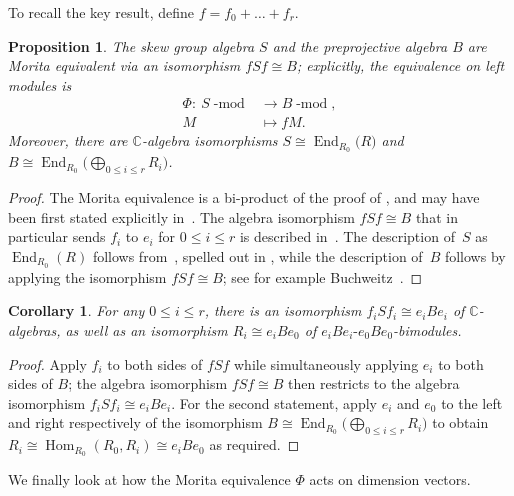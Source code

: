 \documentclass[pdftex]{sigma}%
\newtheorem{Corollary}[Theorem]{Corollary}
\newtheorem{Proposition}[Theorem]{Proposition}
 { \theoremstyle{definition}
\newtheorem{Definition}[Theorem]{Definition}
\newtheorem{Example}[Theorem]{Example}
\newtheorem{Remark}[Theorem]{Remark}
\newtheorem{remarks}[theorem]{Remarks}
}
\newcommand{\SC}{\mathbb{C}} %
\newcommand{\End}{\operatorname{End}}
\newcommand{\Hom}{\operatorname{Hom}}
\DeclareMathOperator{\module}{\mathrm{-mod}}
\numberwithin{equation}{section}
\begin{document}
To recall the key result, define $f=f_0+\dots+f_r$.

\begin{Proposition}\label{prop_morita}
The skew group algebra $S$ and the preprojective algebra $B$ are Morita equivalent via an isomorphism $f S f\cong B$; explicitly, the equivalence on left modules is
\begin{align*}\Phi\colon \ S\module & \longrightarrow B\module, \\
M & \mapsto fM.
\end{align*}
Moreover, there are $\mathbb{C}$-algebra isomorphisms
$S\cong \End_{R_0}\big(R)$ and $B\cong \End_{R_0}\big({\bigoplus}_{0\leq i\leq r} R_i\big)$.
\end{Proposition}

\begin{proof} The Morita equivalence is a bi-product of the proof of \cite[Proposition~2.13]{reiten1989two}, and may have been first stated explicitly in~\cite[Theorem~0.1]{crawley1998noncommutative}. The algebra isomorphism $f S f\cong B$ that in particular sends $f_i$ to $e_i$ for $0\leq i\leq r$ is described in~\cite[Theorem~3.4]{crawley1998noncommutative}. The description of~$S$ as $\End_{R_0}(R)$ follows from~\cite{Auslander62}, spelled out in
\cite[Theorem~5.12]{LeuschkeWiegand12}, while the description of~$B$ follows by applying the isomorphism $fSf\cong B$; see for example Buchweitz~\cite{Buchweitz}.
\end{proof}

\begin{Corollary}
\label{cor:moritaRiBi}
 For any $0\leq i\leq r$, there is an isomorphism $f_i S f_i\cong e_iBe_i$ of $\SC$-algebras, as well as an isomorphism $R_i \cong e_iBe_0$ of $e_iBe_i\text{-}e_0Be_0$-bimodules.
\end{Corollary}
\begin{proof}
Apply $f_i$ to both sides of $fSf$ while simultaneously applying $e_i$ to both sides of $B$; the algebra isomorphism $fSf\cong B$ then restricts to the algebra isomorphism $f_i S f_i\cong e_iBe_i$. For the second statement, apply $e_i$ and $e_0$ to the left and right respectively of the isomorphism $B\cong \End_{R_0}\big({\bigoplus}_{0\leq i\leq r} R_i\big)$ to obtain $R_i\cong \Hom_{R_0}(R_0,R_i)\cong e_i B e_0$ as required.
\end{proof}

We finally look at how the Morita equivalence $\Phi$ acts on dimension vectors.
\end{document}
